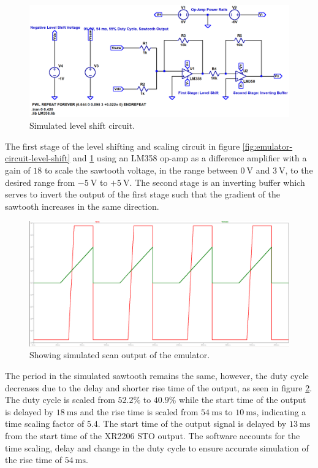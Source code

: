 \documentclass[class=report,11pt,crop=false]{standalone}
\begin{document}
	\begin{figure}[ht!]
		\centering
		\includegraphics[width=0.65\linewidth]{Figures/Methodology/emulator-triangle-shift-ct-sim-1}
		\caption{Simulated level shift circuit.}
		\label{fig:sawtooth-sim-ltspice}
	\end{figure}

	The first stage of the level shifting and scaling circuit in figure \ref{fig:emulator-circuit-level-shift} and \ref{fig:sawtooth-sim-ltspice} using an LM358 op-amp as a difference amplifier with a gain of $18$ to scale the sawtooth voltage, in the range between $\SI{0}{\volt}$ and $\SI{3}{\volt}$, to the desired range from $-\SI{5}{\volt}$ to $+\SI{5}{\volt}$. The second stage is an inverting buffer which serves to invert the output of the first stage such that the gradient of the sawtooth increases in the same direction. 

	\begin{figure}
		\centering
		\includegraphics[width=0.7\linewidth]{Figures/Methodology/emulator-sawtooth-output-1}
		\caption{Showing simulated scan output of the emulator.}
		\label{fig:sawtooth-sim-output}
	\end{figure}

	The period in the simulated sawtooth remains the same, however, the duty cycle decreases due to the delay and shorter rise time of the output, as seen in figure \ref{fig:sawtooth-sim-output}. The duty cycle is scaled from $52.2\%$ to $40.9\%$ while the start time of the output is delayed by $\SI{18}{\milli\second}$ and the rise time is scaled from $\SI{54}{\milli\second}$ to $\SI{10}{\milli\second}$, indicating a time scaling factor of 5.4. The start time of the output signal is delayed by $\SI{13}{\milli\second}$ from the start time of the XR2206 STO output. The software accounts for the time scaling, delay and change in the duty cycle to ensure accurate simulation of the rise time of $\SI{54}{\milli\second}$. 
	
\end{document}
